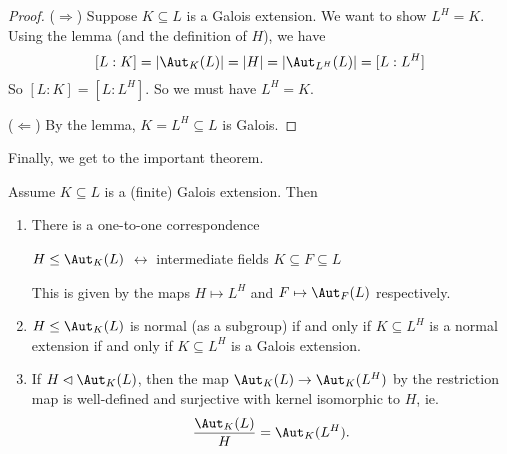 \documentclass[a4paper]{article}
\begin{document}
\begin{proof}
  ($\Rightarrow$) Suppose $K\subseteq L$ is a Galois extension. We want to show $L^H = K$. Using the lemma (and the definition of $H$), we have
  \[
    [L:K] = |\Aut_K(L)| = |H| = |\Aut_{L^H}(L)| = [L:L^H]
  \]
  So $[L:K] = [L:L^H]$. So we must have $L^H = K$.

  ($\Leftarrow$) By the lemma, $K = L^H \subseteq L$ is Galois.
\end{proof}

Finally, we get to the important theorem.
\begin{thm}
  Assume $K\subseteq L$ is a (finite) Galois extension. Then
  \begin{enumerate}
    \item There is a one-to-one correspondence
      \begin{center}
        $H\leq \Aut_K(L)$ $\longleftrightarrow$ intermediate fields $K\subseteq F \subseteq L$
      \end{center}
      This is given by the maps $H \mapsto L^H$ and $F\mapsto \Aut_F(L)$ respectively.
    \item $H\leq \Aut_K(L)$ is normal (as a subgroup) if and only if $K \subseteq L^H$ is a normal extension if and only if $K\subseteq L^H$ is a Galois extension.
    \item If $H\lhd \Aut_K(L)$, then the map $\Aut_K(L) \to \Aut_K(L^H)$ by the restriction map is well-defined and surjective with kernel isomorphic to $H$, ie.
      \[
        \frac{\Aut_K(L)}{H} = \Aut_K(L^H).
      \]
  \end{enumerate}
\end{thm}
\end{document}
